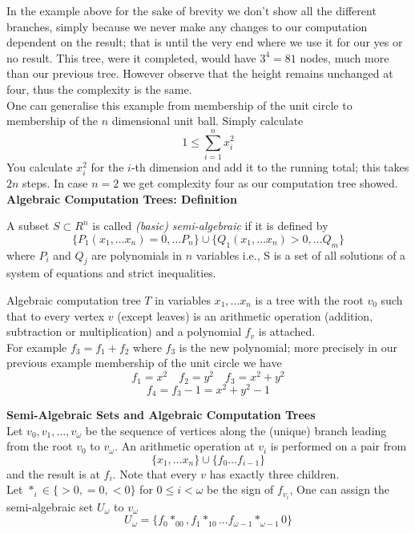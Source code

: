 In the example above for the sake of brevity we don't show all the different branches,
simply because we never make any changes to our computation dependent on the result;
that is until the very end where we use it for our yes or no result.
This tree, were it completed, would have $3^4 = 81$ nodes,
much more than our previous tree.
However observe that the height remains unchanged at four,
thus the complexity is the same.\\

One can generalise this example from membership of the unit circle to membership
of the $n$ dimensional unit ball. Simply calculate
$$1 \leq \sum_{i=1}^{n} x_i^2$$
You calculate $x_i^2$ for the $i$-th dimension and add it to the running total;
this takes $2n$ steps.
In case $n = 2$ we get complexity four as our computation tree showed.\\

\textbf{Algebraic Computation Trees: Definition}
\begin{definition}
    A subset $S \subset R^n$ is called \textit{(basic) semi-algebraic} if it is defined by
    $$\{P_1(x_1,\dots x_n) = 0,\dots P_n\}
    \cup
    \{Q_1(x_1,\dots x_n) > 0,\dots Q_m\}$$
    where $P_i$ and $Q_j$ are polynomials in $n$ variables
    i.e., S is a set of all solutions of a system of equations and strict inequalities.
\end{definition}

Algebraic computation tree $T$ in variables $x_1,\dots x_n$
is a tree with the root $v_0$ such that to every vertex $v$ (except leaves)
is an arithmetic operation (addition, subtraction or multiplication) 
and a polynomial $f_v$ is attached.\\

For example $f_3 = f_1 + f_2$ where $f_3$ is the new polynomial;
more precisely in our previous example membership of the unit circle
we have
$$f_1 = x^2 \quad f_2 = y^2 \quad f_3 = x^2 + y^2$$
$$f_4 = f_3 - 1 = x^2 + y^2 - 1$$

\textbf{Semi-Algebraic Sets and Algebraic Computation Trees}\\
Let $v_0, v_1,\dots, v_\omega$ be the sequence of vertices
along the (unique) branch leading from the root $v_0$ to $v_\omega$.
An arithmetic operation at $v_i$ is performed on a pair from
$$\{x_1,\dots x_n\} \cup \{f_0\dots f_{i - 1}\}$$
and the result is at $f_i$.
Note that every $v$ has exactly three children.\\

Let $*_i \in \{>0,=0,<0\}$ for $0 \leq i < \omega$ be the sign of $f_{v_i}$,
One can assign the semi-algebraic set $U_\omega$ to $v_\omega$
$$U_\omega = \{f_0*_00,f_1*_10\dots f_{\omega - 1} *_{\omega - 1}0\}$$

